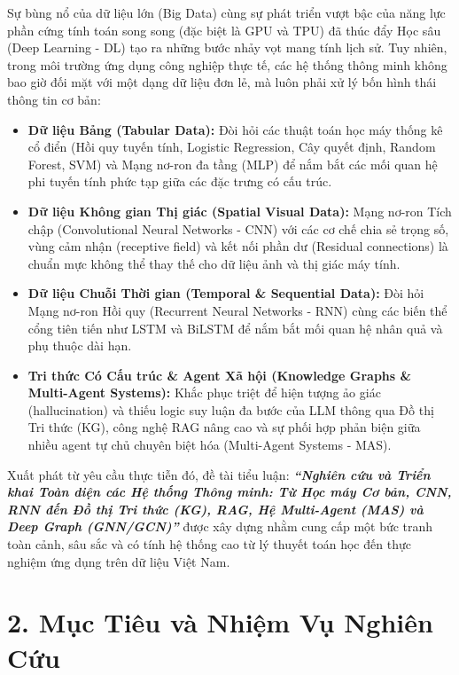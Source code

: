 \documentclass[12pt,a4paper]{report}
\begin{document}
Sự bùng nổ của dữ liệu lớn (Big Data) cùng sự phát triển vượt bậc của năng lực phần cứng tính toán song song (đặc biệt là GPU và TPU) đã thúc đẩy Học sâu (Deep Learning - DL) tạo ra những bước nhảy vọt mang tính lịch sử. Tuy nhiên, trong môi trường ứng dụng công nghiệp thực tế, các hệ thống thông minh không bao giờ đối mặt với một dạng dữ liệu đơn lẻ, mà luôn phải xử lý bốn hình thái thông tin cơ bản:
\begin{itemize}[leftmargin=1.2cm]
    \item \textbf{Dữ liệu Bảng (Tabular Data):} Đòi hỏi các thuật toán học máy thống kê cổ điển (Hồi quy tuyến tính, Logistic Regression, Cây quyết định, Random Forest, SVM) và Mạng nơ-ron đa tầng (MLP) để nắm bắt các mối quan hệ phi tuyến tính phức tạp giữa các đặc trưng có cấu trúc.
    \item \textbf{Dữ liệu Không gian Thị giác (Spatial Visual Data):} Mạng nơ-ron Tích chập (Convolutional Neural Networks - CNN) với các cơ chế chia sẻ trọng số, vùng cảm nhận (receptive field) và kết nối phần dư (Residual connections) là chuẩn mực không thể thay thế cho dữ liệu ảnh và thị giác máy tính.
    \item \textbf{Dữ liệu Chuỗi Thời gian (Temporal \& Sequential Data):} Đòi hỏi Mạng nơ-ron Hồi quy (Recurrent Neural Networks - RNN) cùng các biến thể cổng tiên tiến như LSTM và BiLSTM để nắm bắt mối quan hệ nhân quả và phụ thuộc dài hạn.
    \item \textbf{Tri thức Có Cấu trúc \& Agent Xã hội (Knowledge Graphs \& Multi-Agent Systems):} Khắc phục triệt để hiện tượng ảo giác (hallucination) và thiếu logic suy luận đa bước của LLM thông qua Đồ thị Tri thức (KG), công nghệ RAG nâng cao và sự phối hợp phản biện giữa nhiều agent tự chủ chuyên biệt hóa (Multi-Agent Systems - MAS).
\end{itemize}

Xuất phát từ yêu cầu thực tiễn đó, đề tài tiểu luận: \textbf{\textit{“Nghiên cứu và Triển khai Toàn diện các Hệ thống Thông minh: Từ Học máy Cơ bản, CNN, RNN đến Đồ thị Tri thức (KG), RAG, Hệ Multi-Agent (MAS) và Deep Graph (GNN/GCN)”}} được xây dựng nhằm cung cấp một bức tranh toàn cảnh, sâu sắc và có tính hệ thống cao từ lý thuyết toán học đến thực nghiệm ứng dụng trên dữ liệu Việt Nam.

\section*{2. Mục Tiêu và Nhiệm Vụ Nghiên Cứu}
\end{document}
